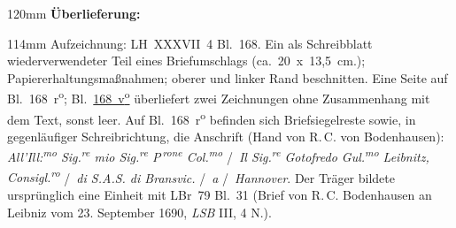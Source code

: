 \begin{ledgroupsized}[r]{120mm}
\footnotesize
\pstart
\noindent\textbf{Überlieferung:}
\pend
\end{ledgroupsized}
\begin{ledgroupsized}[r]{114mm}
\footnotesize
\pstart \parindent -6mm
%
Aufzeichnung:
LH~XXXVII~4 Bl.~168. 
Ein als Schreibblatt wiederverwendeter Teil eines Briefumschlags (ca.~20~x~13,5~cm.);
Papiererhaltungsmaßnahmen;
oberer und linker Rand beschnitten.
Eine Seite auf Bl.~168~r\textsuperscript{o};
Bl.~\href{\Scan{LH_37_04_168v}}{168~v\textsuperscript{o}}
überliefert zwei Zeichnungen ohne Zusammenhang mit dem Text, sonst leer.
Auf Bl.~168~r\textsuperscript{o} befinden sich Briefsiegelreste sowie, in gegenläufiger Schreibrichtung, die Anschrift 
(Hand von R.\,C. von Bodenhausen):	
\textit{All'\;Ill:\textsuperscript{mo} Sig.\textsuperscript{re} mio Sig.\textsuperscript{re} P\textsuperscript{\,rone} Col.\textsuperscript{mo}} \lbrack/\rbrack\
\textit{Il Sig.\textsuperscript{re} Gotofredo Gul.\textsuperscript{mo} Leibnitz, Consigl.\textsuperscript{ro}} \lbrack/\rbrack\
\textit{di S.A.S. di Bransvic.} \lbrack/\rbrack\ \textit{a} \lbrack/\rbrack\ \textit{Hannover}.
Der Träger bildete ursprünglich eine Einheit mit 
LBr~79 Bl.~31 (\cite{02131}Brief von R.\,C. Bodenhausen an Leibniz vom 23. September 1690,
\textit{LSB} III, 4 N.\;275).	
\pend
\end{ledgroupsized}
\vspace{5mm}
